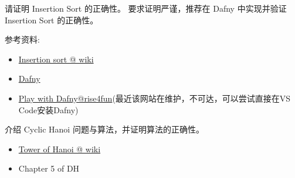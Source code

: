 \documentclass[a4paper, justified]{tufte-handout}
\begin{document}
\beginot

\begin{ot}
  请证明 Insertion Sort 的正确性。
  要求证明严谨，推荐在 Dafny 中实现并验证 Insertion Sort 的正确性。

  参考资料:
  \begin{itemize}
    \item \href{https://en.wikipedia.org/wiki/Insertion\_sort}{Insertion sort @ wiki}
    \item \href{https://www.microsoft.com/en-us/research/project/dafny-a-language-and-program-verifier-for-functional-correctness/}{Dafny}
    \item \href{https://rise4fun.com/Dafny}{Play with Dafny@rise4fun}(最近该网站在维护，不可达，可以尝试直接在VS Code安装Dafny)
  \end{itemize}
\end{ot}

\vspace{0.50cm}
\begin{ot}
  介绍 Cyclic Hanoi 问题与算法，并证明算法的正确性。

  \begin{itemize}
    \item \href{https://en.wikipedia.org/wiki/Tower\_of\_Hanoi}{Tower of Hanoi @ wiki}
    \item Chapter 5 of DH
  \end{itemize}
\end{ot}




\beginfb

\end{document}
